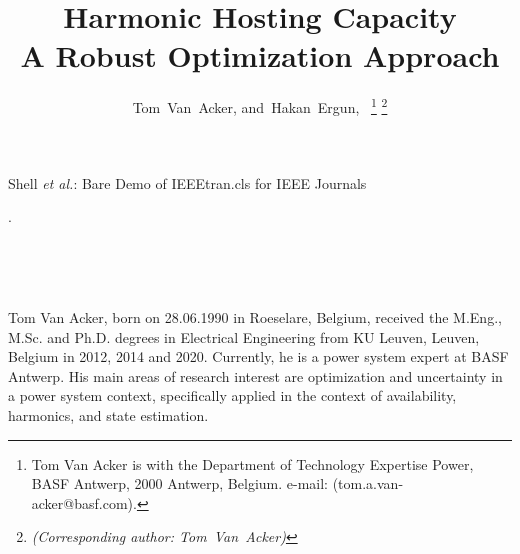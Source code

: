 \documentclass[journal]{IEEEtran}
\begin{document}
\title{Harmonic Hosting Capacity \\ A Robust Optimization Approach}
\author{Tom~Van~Acker, %
        and~Hakan~Ergun,~%
\thanks{Tom Van Acker is with the Department of Technology Expertise Power, BASF Antwerp, 2000 Antwerp, Belgium.  e-mail: (tom.a.van-acker@basf.com).}%
\thanks{\textit{(Corresponding author: Tom~Van~Acker)}}}

%
{Shell \MakeLowercase{\textit{et al.}}: Bare Demo of IEEEtran.cls for IEEE Journals}

\maketitle

\begin{abstract}

\end{abstract}

\begin{IEEEkeywords}
.
\end{IEEEkeywords}

\IEEEpeerreviewmaketitle


% 
% 

\newpage
~
\newpage

\appendices



\newpage
~
\newpage


% 

\begin{IEEEbiographynophoto}{Tom Van Acker}, born on 28.06.1990 in Roeselare, Belgium, received the M.Eng., M.Sc. and Ph.D. degrees in Electrical Engineering from KU Leuven, Leuven, Belgium in 2012, 2014 and 2020. Currently, he is a power system expert at BASF Antwerp. His main areas of research interest are optimization and uncertainty in a power system context, specifically applied in the context of availability, harmonics, and state estimation. 
\end{IEEEbiographynophoto}
\end{document}
